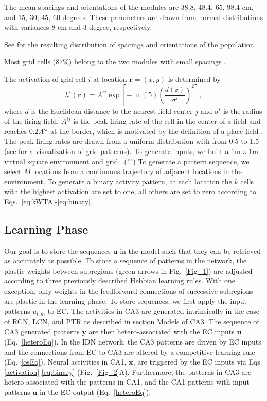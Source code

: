 \documentclass[utf8]{frontiersSCNS} %
\begin{document}
The mean spacings and orientations of the modules are 38.8, 48.4, 65, 98.4 cm, and 15, 30, 45, 60 degrees. These parameters are drawn from normal distributions with variances 8 cm and 3 degree, respectively.

See \cite[Fig 1B-1C]{neher2015memory} for the resulting distribution of spacings and orientations of the population.

Most grid cells ($87\%$) belong to the two modules with small spacings \cite{stensola2012entorhinal}. 

The activation of grid cell $i$ at location $\mathbf{r}=(x,y)$ is determined by
\begin{equation}
\label{eq:grid}
h^i(\mathbf{r}) = A^{ij} \exp \left[ -\ln(5) \left(\frac{d(\mathbf{r})}{\sigma^i}\right)^2 \right],
\end{equation}
where $d$ is the Euclidean distance to the nearest field center $j$ and $\sigma^i$ is the radius of the firing field. $A^{ij}$ is the peak firing rate of the cell in the center of a field and reaches $0.2 A^{ij}$ at the border, which is motivated by the definition of a place field \cite{hafting2005microstructure}. The peak firing rates are drawn from a uniform distribution with from 0.5 to 1.5 (see \cite{neher2015memory} for a visualization of grid patterns). 
To generate inputs, we built a $1\textrm{m} \times 1\textrm{m}$ virtual square environment and grid...(!!!) 
To generate a pattern sequence, we select $M$ locations from a continuous trajectory of adjacent locations in the environment. To generate a binary activity pattern, at each location the $k$ cells with the highest activation are set to one, all others are set to zero according to Eqs.~\ref{eq:kWTA}-\ref{eq:binary}.


\subsection{Learning Phase}


Our goal is to store the sequences $\mathbf u$ in the model such that they can be retrieved as accurately as possible. To store a sequence of patterns in the network, the plastic weights between subregions (green arrows in Fig.~\ref{Fig_1}) are adjusted according to three previously described Hebbian learning rules. With one exception, only weights in the feedforward connections of successive subregions are plastic in the learning phase. To store sequences, we first apply the input patterns $u_{l,m}$ to EC. The activities in CA3 are generated intrinsically in the case of RCN, LCN, and PTR as described in section Models of CA3. The sequence of CA3 generated patterns $\mathbf y$ are then hetero-associated with the EC inputs $\mathbf u$ (Eq.~\ref{heteroEq}). 
%
In the IDN network, the CA3 patterns are driven by EC inputs and the connections from EC to CA3 are altered by a competitive learning rule (Eq.~\ref{osEq}).
%
Neural activities in CA1, $\mathbf x$, are triggered by the EC inputs via Eqs. \ref{activation}-\ref{eq:binary} (Fig.~\ref{Fig_2}A). Furthermore, the patterns in CA3 are hetero-associated with the patterns in CA1, and the CA1 patterns with input patterns $\mathbf u$ in the EC output (Eq.~\ref{heteroEq}). 
\end{document}

